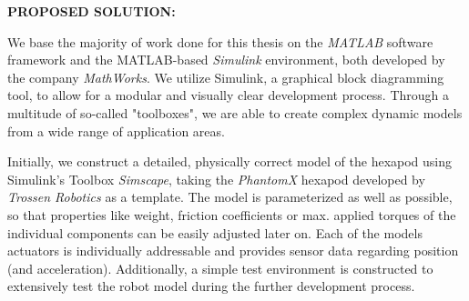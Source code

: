 \textbf{PROPOSED SOLUTION:}



We base the majority of work done for this thesis on the \textit{MATLAB\textsuperscript{\textregistered}} software framework and the MATLAB-based \textit{Simulink\textsuperscript{\textregistered}} environment, both developed by the company \textit{MathWorks\textsuperscript{\textregistered}}.
We utilize Simulink, a graphical block diagramming tool, to allow for a modular and visually clear development process.
Through a multitude of so-called "toolboxes", we are able to create complex dynamic models from a wide range of application areas.

Initially, we construct a detailed, physically correct model of the hexapod using Simulink's Toolbox \textit{Simscape\textsuperscript{\texttrademark}}, taking the \emph{PhantomX} hexapod developed by \emph{Trossen Robotics} as a template.
The model is parameterized as well as possible, so that properties like weight, friction coefficients or max. applied torques of the individual components can be easily adjusted later on.
Each of the models actuators is individually addressable and provides sensor data regarding position (and acceleration).
Additionally, a simple test environment is constructed to extensively test the robot model during the further development process.

